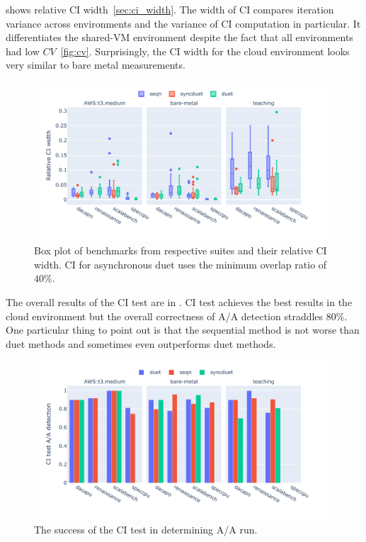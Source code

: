  shows relative CI width~\ref{sec:ci_width}.
The width of CI compares iteration variance across environments and the variance of CI computation in particular.
It differentiates the \mbox{shared-VM} environment despite the fact that all environments had low $CV$~\ref{fig:cv}.
Surprisingly, the CI width for the cloud environment looks very similar to bare metal measurements.

\begin{figure}
	\centering
	\includegraphics[width=1\linewidth]{./figures/ci_width.pdf}
	\caption{
		Box plot of benchmarks from respective suites and their relative CI width. 
		CI for asynchronous duet uses the minimum overlap ratio of $40\%$.
	}
	\label{fig:ci_width}
\end{figure}

The overall results of the CI test are in .
CI test achieves the best results in the cloud environment but the overall correctness of A/A detection straddles $80\%$.
One particular thing to point out is that the sequential method is not worse than duet methods and sometimes even outperforms duet methods.

\begin{figure}
	\centering
	\includegraphics[width=1\linewidth]{./figures/citest_aa_match.pdf}
	\caption{
		The success of the CI test in determining A/A run.
	}
	\label{fig:citest_aa}
\end{figure}

